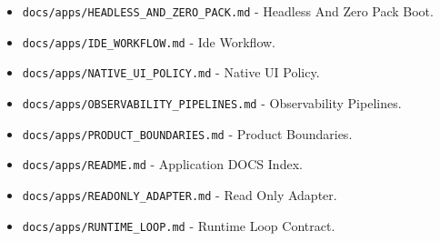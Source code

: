 \documentclass[9pt,a4paper,openany]{book}
\begin{document}
\begin{itemize}
\item \texttt{docs/\allowbreak{}apps/\allowbreak{}HEADLESS\_\allowbreak{}AND\_\allowbreak{}ZERO\_\allowbreak{}PACK.\allowbreak{}md} -\allowbreak{} Headless And Zero Pack Boot.\allowbreak{}
\end{itemize}

\begin{itemize}
\item \texttt{docs/\allowbreak{}apps/\allowbreak{}IDE\_\allowbreak{}WORKFLOW.\allowbreak{}md} -\allowbreak{} Ide Workflow.\allowbreak{}
\end{itemize}

\begin{itemize}
\item \texttt{docs/\allowbreak{}apps/\allowbreak{}NATIVE\_\allowbreak{}UI\_\allowbreak{}POLICY.\allowbreak{}md} -\allowbreak{} Native UI Policy.\allowbreak{}
\end{itemize}

\begin{itemize}
\item \texttt{docs/\allowbreak{}apps/\allowbreak{}OBSERVABILITY\_\allowbreak{}PIPELINES.\allowbreak{}md} -\allowbreak{} Observability Pipelines.\allowbreak{}
\end{itemize}

\begin{itemize}
\item \texttt{docs/\allowbreak{}apps/\allowbreak{}PRODUCT\_\allowbreak{}BOUNDARIES.\allowbreak{}md} -\allowbreak{} Product Boundaries.\allowbreak{}
\end{itemize}

\begin{itemize}
\item \texttt{docs/\allowbreak{}apps/\allowbreak{}README.\allowbreak{}md} -\allowbreak{} Application DOCS Index.\allowbreak{}
\end{itemize}

\begin{itemize}
\item \texttt{docs/\allowbreak{}apps/\allowbreak{}READONLY\_\allowbreak{}ADAPTER.\allowbreak{}md} -\allowbreak{} Read Only Adapter.\allowbreak{}
\end{itemize}

\begin{itemize}
\item \texttt{docs/\allowbreak{}apps/\allowbreak{}RUNTIME\_\allowbreak{}LOOP.\allowbreak{}md} -\allowbreak{} Runtime Loop Contract.\allowbreak{}
\end{itemize}
\end{document}
